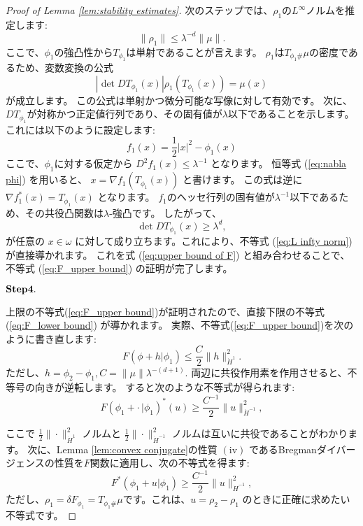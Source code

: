 \documentclass{jsarticle}
\theoremstyle{definition}
\begin{document}
\begin{proof}[Proof of Lemma \ref{lem:stability estimates}]
  次のステップでは、$\rho_1$の$L^{\infty}$ノルムを推定します:
  \begin{equation}
    \label{eq:L infty norm}
    \| \rho_1 \| \leq \lambda^{-d} \|\mu\|.
  \end{equation}
  ここで、$\phi_1$の強凸性から$T_{\phi_1}$は単射であることが言えます。
  $\rho_1$は$T_{\phi_1 \#} \mu$の密度であるため、変数変換の公式
  \[
    |\det D T_{\phi_1}(x)| \rho_1(T_{\phi_1}(x)) = \mu(x)
  \]
  が成立します。
  この公式は単射かつ微分可能な写像に対して有効です。
  次に、$DT_{\phi_1}$が対称かつ正定値行列であり、その固有値が$\lambda$以下であることを示します。
  これには以下のように設定します:
  \[
    f_1(x) = \frac{1}{2} |x|^2 - \phi_1(x)
  \]
  ここで、$\phi_1$に対する仮定から \(D^2 f_1(x) \leq \lambda^{-1}\) となります。
  恒等式 (\ref{eq:nabla phi}) を用いると、 \(x = \nabla f_1(T_{\phi_1}(x))\) と書けます。
  この式は逆に \(\nabla f_1^*(x) = T_{\phi_1}(x)\) となります。
  $f_1$のヘッセ行列の固有値が$\lambda^{-1}$以下であるため、その共役凸関数は$\lambda$-強凸です。
  したがって、
  \[
    \det D T_{\phi_1}(x) \geq \lambda^d,
  \]
  が任意の \(x \in \omega\) に対して成り立ちます。これにより、不等式 (\ref{eq:L infty norm}) が直接導かれます。
  これを式 (\ref{eq:upper bound of F}) と組み合わせることで、不等式 (\ref{eq:F_upper bound}) の証明が完了します。

  $\bold{Step 4.}$

  上限の不等式(\ref{eq:F_upper bound})が証明されたので、直接下限の不等式 (\ref{eq:F_lower bound}) が導かれます。
  実際、不等式(\ref{eq:F_upper bound})を次のように書き直します:
  \[
    F(\phi + h|\phi_1) \leq \frac{C}{2}\|h\|^2_{\dot{H}^1}.
  \]
  ただし、$h = \phi_2 - \phi_1, C = \|\mu\| \lambda^{-(d+1)}$.
  両辺に共役作用素を作用させると、不等号の向きが逆転します。
  すると次のような不等式が得られます:
  \[
    F(\phi_1 + \cdot \,|\phi_1)^*(u) \geq \frac{C^{-1}}{2} \|u\|^2_{\dot{H}^{-1}}, 
  \]

  ここで $ \frac{1}{2}\| \cdot \|^2_{\dot{H}^1}$ ノルムと $ \frac{1}{2}\| \cdot \|^2_{\dot{H}^{-1}} $ ノルムは互いに共役であることがわかります。
  次に、Lemma \ref{lem:convex conjugate}の性質 $(\mathrm{iv})$ であるBregmanダイバージェンスの性質を$F$関数に適用し、次の不等式を得ます:
  \[
    F^*(\phi_1 + u | \phi_1) \geq \frac{C^{-1}}{2} \|u\|^2_{\dot{H}^{-1}}, 
  \]
  ただし、$\rho_1 = \delta F_{\phi_1} = T_{\phi_1 \#} \mu$です。これは、\( u = \rho_2 - \rho_1 \) のときに正確に求めたい不等式です。

\end{proof}
\end{document}
